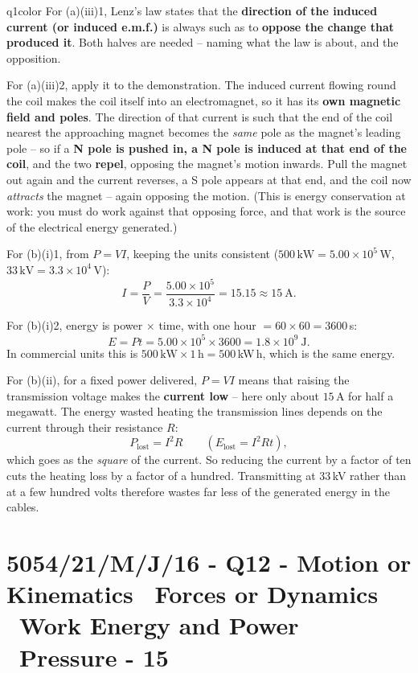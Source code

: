 \documentclass[11pt,a4paper]{article}
\newcommand{\examq}[4]{\section[#1 - Q#2]{#1 - Q#2 - #3 - #4}}
\begin{document}
\begin{ansbox}{q1color}
For (a)(iii)1, Lenz's law states that the \textbf{direction of the induced current (or induced e.m.f.)} is always such as to \textbf{oppose the change that produced it}. Both halves are needed -- naming what the law is about, and the opposition.

For (a)(iii)2, apply it to the demonstration. The induced current flowing round the coil makes the coil itself into an electromagnet, so it has its \textbf{own magnetic field and poles}. The direction of that current is such that the end of the coil nearest the approaching magnet becomes the \emph{same} pole as the magnet's leading pole -- so if a \textbf{N pole is pushed in, a N pole is induced at that end of the coil}, and the two \textbf{repel}, opposing the magnet's motion inwards. Pull the magnet out again and the current reverses, a S pole appears at that end, and the coil now \emph{attracts} the magnet -- again opposing the motion. (This is energy conservation at work: you must do work against that opposing force, and that work is the source of the electrical energy generated.)

For (b)(i)1, from $P = VI$, keeping the units consistent ($500\,\mathrm{kW} = 5.00 \times 10^5$\,W, $33\,\mathrm{kV} = 3.3 \times 10^4$\,V):
\[ I = \frac{P}{V} = \frac{5.00 \times 10^{5}}{3.3 \times 10^{4}} = 15.15 \approx 15\ \mathrm{A}. \]

For (b)(i)2, energy is power $\times$ time, with one hour $= 60 \times 60 = 3600$\,s:
\[ E = Pt = 5.00 \times 10^{5} \times 3600 = 1.8 \times 10^{9}\ \mathrm{J}. \]
In commercial units this is $500\,\mathrm{kW} \times 1\,\mathrm{h} = 500$\,kW\,h, which is the same energy.

For (b)(ii), for a fixed power delivered, $P = VI$ means that raising the transmission voltage makes the \textbf{current low} -- here only about $15$\,A for half a megawatt. The energy wasted heating the transmission lines depends on the current through their resistance $R$:
\[ P_{\text{lost}} = I^2R \qquad (E_{\text{lost}} = I^2Rt), \]
which goes as the \emph{square} of the current. So reducing the current by a factor of ten cuts the heating loss by a factor of a hundred. Transmitting at $33$\,kV rather than at a few hundred volts therefore wastes far less of the generated energy in the cables.
\end{ansbox}

\examq{5054/21/M/J/16}{12}{Motion or Kinematics \textperiodcentered\ Forces or Dynamics \textperiodcentered\ Work Energy and Power \textperiodcentered\ Pressure}{15}
\end{document}
